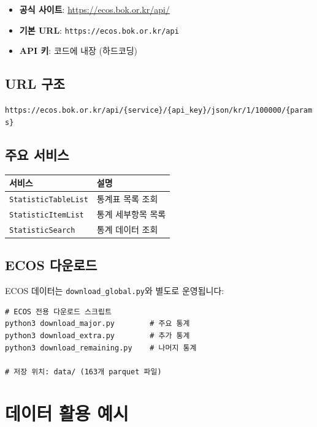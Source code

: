 \documentclass[11pt,a4paper]{article}
\newcommand{\apibox}[1]{%
    \noindent\colorbox{lightaccent}{\parbox{\dimexpr\textwidth-2\fboxsep}{%
        \small\texttt{#1}%
    }}%
    \vspace{0.5em}%
}
\newcommand{\code}[1]{\texttt{#1}}
\begin{document}
\begin{itemize}[leftmargin=2em]
    \item \textbf{공식 사이트}: \url{https://ecos.bok.or.kr/api/}
    \item \textbf{기본 URL}: \code{https://ecos.bok.or.kr/api}
    \item \textbf{API 키}: 코드에 내장 (하드코딩)
\end{itemize}

\subsection{URL 구조}

\apibox{https://ecos.bok.or.kr/api/\{service\}/\{api\_key\}/json/kr/1/100000/\{params\}}

\subsection{주요 서비스}

\begin{table}[h]
\centering
\begin{tabular}{l l}
\toprule
\textbf{서비스} & \textbf{설명} \\
\midrule
\code{StatisticTableList} & 통계표 목록 조회 \\
\code{StatisticItemList}  & 통계 세부항목 목록 \\
\code{StatisticSearch}    & 통계 데이터 조회 \\
\bottomrule
\end{tabular}
\end{table}

\subsection{ECOS 다운로드}

ECOS 데이터는 \code{download\_global.py}와 별도로 운영됩니다:

\begin{lstlisting}[style=bash]
# ECOS 전용 다운로드 스크립트
python3 download_major.py        # 주요 통계
python3 download_extra.py        # 추가 통계
python3 download_remaining.py    # 나머지 통계

# 저장 위치: data/ (163개 parquet 파일)
\end{lstlisting}


\section{데이터 활용 예시}
\end{document}
